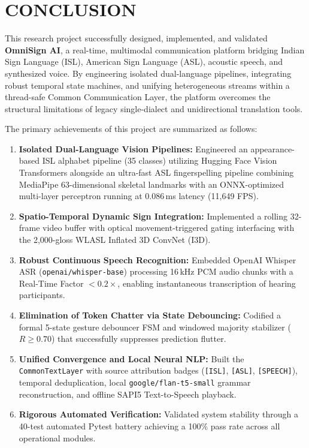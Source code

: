 \documentclass[12pt,a4paper]{report}
\begin{document}
\section{CONCLUSION} \label{sec:concl-achieve}
This research project successfully designed, implemented, and validated \textbf{OmniSign AI}, a real-time, multimodal communication platform bridging Indian Sign Language (ISL), American Sign Language (ASL), acoustic speech, and synthesized voice. By engineering isolated dual-language pipelines, integrating robust temporal state machines, and unifying heterogeneous streams within a thread-safe Common Communication Layer, the platform overcomes the structural limitations of legacy single-dialect and unidirectional translation tools.

The primary achievements of this project are summarized as follows:
\begin{enumerate}[noitemsep, topsep=2pt]
\item \textbf{Isolated Dual-Language Vision Pipelines:} Engineered an appearance-based ISL alphabet pipeline (35 classes) utilizing Hugging Face Vision Transformers alongside an ultra-fast ASL fingerspelling pipeline combining MediaPipe 63-dimensional skeletal landmarks with an ONNX-optimized multi-layer perceptron running at 0.086\,ms latency (11,649 FPS).
\item \textbf{Spatio-Temporal Dynamic Sign Integration:} Implemented a rolling 32-frame video buffer with optical movement-triggered gating interfacing with the 2,000-gloss WLASL Inflated 3D ConvNet (I3D).
\item \textbf{Robust Continuous Speech Recognition:} Embedded OpenAI Whisper ASR (\texttt{openai/whisper-base}) processing 16\,kHz PCM audio chunks with a Real-Time Factor $<0.2\times$, enabling instantaneous transcription of hearing participants.
\item \textbf{Elimination of Token Chatter via State Debouncing:} Codified a formal 5-state gesture debouncer FSM and windowed majority stabilizer ($R \ge 0.70$) that successfully suppresses prediction flutter.
\item \textbf{Unified Convergence and Local Neural NLP:} Built the \texttt{CommonTextLayer} with source attribution badges (\texttt{[ISL]}, \texttt{[ASL]}, \texttt{[SPEECH]}), temporal deduplication, local \texttt{google/flan-t5-small} grammar reconstruction, and offline SAPI5 Text-to-Speech playback.
\item \textbf{Rigorous Automated Verification:} Validated system stability through a 40-test automated Pytest battery achieving a 100\% pass rate across all operational modules.
\end{enumerate}
\end{document}
